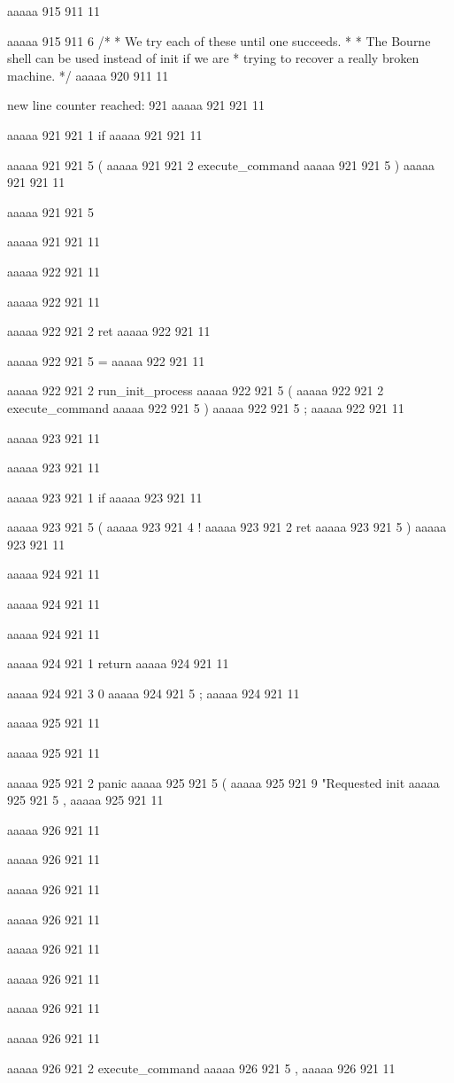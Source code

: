 {aaaaa 915 911
11
	
aaaaa 915 911
6
/*
	 * We try each of these until one succeeds.
	 *
	 * The Bourne shell can be used instead of init if we are
	 * trying to recover a really broken machine.
	 */
aaaaa 920 911
11


new line counter reached: 921
aaaaa 921 921
11
	
aaaaa 921 921
1
if
aaaaa 921 921
11
 
aaaaa 921 921
5
(
aaaaa 921 921
2
execute_command
aaaaa 921 921
5
)
aaaaa 921 921
11
 
aaaaa 921 921
5
{
aaaaa 921 921
11


aaaaa 922 921
11
	
aaaaa 922 921
11
	
aaaaa 922 921
2
ret
aaaaa 922 921
11
 
aaaaa 922 921
5
=
aaaaa 922 921
11
 
aaaaa 922 921
2
run_init_process
aaaaa 922 921
5
(
aaaaa 922 921
2
execute_command
aaaaa 922 921
5
)
aaaaa 922 921
5
;
aaaaa 922 921
11


aaaaa 923 921
11
	
aaaaa 923 921
11
	
aaaaa 923 921
1
if
aaaaa 923 921
11
 
aaaaa 923 921
5
(
aaaaa 923 921
4
!
aaaaa 923 921
2
ret
aaaaa 923 921
5
)
aaaaa 923 921
11


aaaaa 924 921
11
	
aaaaa 924 921
11
	
aaaaa 924 921
11
	
aaaaa 924 921
1
return
aaaaa 924 921
11
 
aaaaa 924 921
3
0
aaaaa 924 921
5
;
aaaaa 924 921
11


aaaaa 925 921
11
	
aaaaa 925 921
11
	
aaaaa 925 921
2
panic
aaaaa 925 921
5
(
aaaaa 925 921
9
"Requested init %
aaaaa 925 921
5
,
aaaaa 925 921
11


aaaaa 926 921
11
	
aaaaa 926 921
11
	
aaaaa 926 921
11
 
aaaaa 926 921
11
 
aaaaa 926 921
11
 
aaaaa 926 921
11
 
aaaaa 926 921
11
 
aaaaa 926 921
11
 
aaaaa 926 921
2
execute_command
aaaaa 926 921
5
,
aaaaa 926 921
11
 
}}
